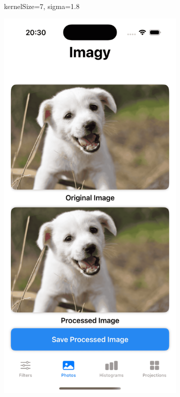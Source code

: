 \documentclass[a4paper]{article}
\begin{document}
\begin{figure}[H]
\begin{subfigure}{0.2\textwidth}
        \caption{kernelSize=7, sigma=1.8}
        \label{fig:trees_gaussian_7_1}
    \end{subfigure}
    \begin{subfigure}{0.2\textwidth}
        \centering
        \includegraphics[width=\linewidth]{images/dog_gaussian_5_0.3.png}

\end{subfigure}
\end{figure}
\end{document}
